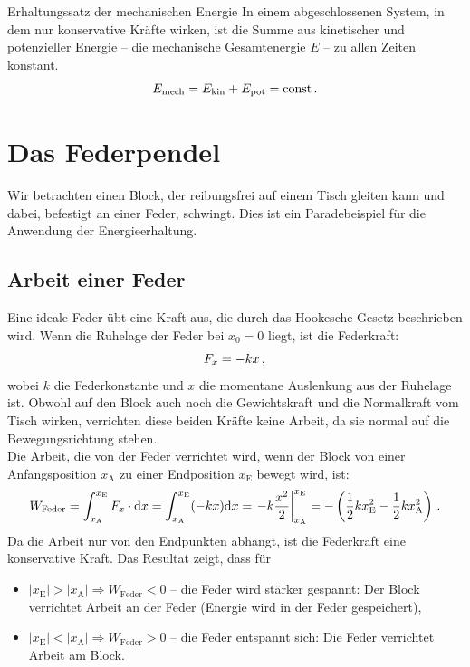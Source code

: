 \begin{importantbox}{Erhaltungssatz der mechanischen Energie}
    In einem abgeschlossenen System, in dem nur konservative Kräfte wirken, ist die Summe aus kinetischer und potenzieller Energie – die mechanische Gesamtenergie $E$ – zu allen Zeiten konstant. 
    \begin{equation}\label{eq: mechanische_energieerhaltung}
        E_{\text{mech}} = E_{\text{kin}} + E_{\text{pot}} = \mathrm{const} \,.
    \end{equation}
\end{importantbox}


\section{Das Federpendel}\label{sec: beispiel_federpendel}
Wir betrachten einen Block, der reibungsfrei auf einem Tisch gleiten kann und dabei, befestigt an einer Feder, schwingt. Dies ist ein Paradebeispiel für die Anwendung der Energieerhaltung.

\subsection{Arbeit einer Feder}\label{subsec: arbeit_feder}
Eine ideale Feder übt eine Kraft aus, die durch das Hookesche Gesetz beschrieben wird. Wenn die Ruhelage der Feder bei $x_0=0$ liegt, ist die Federkraft:
\begin{equation}
    F_x = -kx \,{,}\,
\end{equation}
wobei $k$ die Federkonstante und $x$ die momentane Auslenkung aus der Ruhelage ist. Obwohl auf den Block auch noch die Gewichtskraft und die Normalkraft vom Tisch wirken, verrichten diese beiden Kräfte keine Arbeit, da sie normal auf die Bewegungsrichtung stehen. \\

Die Arbeit, die von der Feder verrichtet wird, wenn der Block von einer Anfangsposition $x_\text{A}$ zu einer Endposition $x_\text{E}$ bewegt wird, ist:
\begin{equation}\label{eq: arbeit_feder}
    W_{\text{Feder}} = \int_{x_\text{A}}^{x_\text{E}} F_x \cdot \mathrm{d} x = \int_{x_\text{A}}^{x_\text{E}} (-kx) \mathrm{d} x = \left. -k \frac{x^2}{2}\right|_{x_\text{A}}^{x_\text{E}} = -\left(\frac{1}{2}k x_\text{E}^2 - \frac{1}{2}k x_\text{A}^2 \right) \,.
\end{equation}
Da die Arbeit nur von den Endpunkten abhängt, ist die Federkraft eine konservative Kraft. Das Resultat zeigt, dass für 
\begin{itemize}
    \item $|x_\text{E}| > |x_\text{A}| \Rightarrow W_\text{Feder} < 0$ -- die Feder wird stärker gespannt: Der Block verrichtet Arbeit an der Feder (Energie wird in der Feder gespeichert), 
    \item $|x_\text{E}| < |x_\text{A}| \Rightarrow W_\text{Feder} > 0$ -- die Feder entspannt sich: Die Feder verrichtet Arbeit am Block.
\end{itemize}

